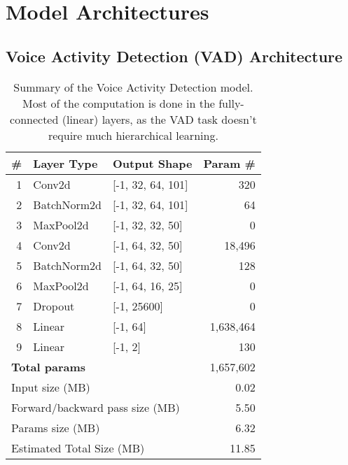 \chapter{Model Architectures}

\section{Voice Activity Detection (VAD) Architecture}
\label{app:VAD_arc}
\begin{table}[H]
\centering
\begin{tabular}{|r l l r|}
\hline
\textbf{\#} & \textbf{Layer Type} & \textbf{Output Shape} & \textbf{Param \#} \\
\hline
1 & Conv2d       & [-1, 32, 64, 101] & 320 \\
2 & BatchNorm2d  & [-1, 32, 64, 101] & 64 \\
3 & MaxPool2d    & [-1, 32, 32, 50]  & 0 \\
4 & Conv2d       & [-1, 64, 32, 50]  & 18,496 \\
5 & BatchNorm2d  & [-1, 64, 32, 50]  & 128 \\
6 & MaxPool2d    & [-1, 64, 16, 25]  & 0 \\
7 & Dropout      & [-1, 25600]       & 0 \\
8 & Linear       & [-1, 64]          & 1,638,464 \\
9 & Linear       & [-1, 2]           & 130 \\
\hline
\multicolumn{3}{|l|}{\textbf{Total params}}            & 1,657,602 \\
\hline
\multicolumn{3}{|l|}{Input size (MB)}                  & 0.02 \\
\multicolumn{3}{|l|}{Forward/backward pass size (MB)}  & 5.50 \\
\multicolumn{3}{|l|}{Params size (MB)}                 & 6.32 \\
\multicolumn{3}{|l|}{Estimated Total Size (MB)}        & 11.85 \\
\hline
\end{tabular}
\caption{Summary of the Voice Activity Detection model. Most of the computation is done in the fully-connected (linear) layers, as the VAD task doesn't require much hierarchical learning.}
\end{table}


